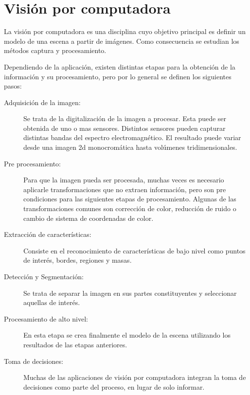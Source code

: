 
\section{Visión por computadora}

La visión por computadora es una disciplina cuyo objetivo principal es definir
un modelo de una escena a partir de imágenes\cite{cvLinda2001}. Como
consecuencia se estudian los métodos captura y procesamiento.

Dependiendo de la aplicación, existen distintas etapas para la obtención de la
información y su procesamiento, pero por lo general se definen los siguientes
pasos\cite{digitalImageProcessing2ed, wikiCV}:

\begin{description}

	\item[Adquisición de la imagen:] Se trata de la digitalización de la
		imagen a procesar. Esta puede ser obtenida de uno o mas
		sensores. Distintos sensores pueden capturar distintas bandas
		del espectro electromagnético. El resultado puede variar desde
		una imagen 2d monocromática hasta volúmenes tridimensionales.

	\item[Pre procesamiento:] Para que la imagen pueda ser procesada, muchas
		veces es necesario aplicarle transformaciones que no extraen
		información, pero son pre condiciones para las siguientes etapas
		de procesamiento. Algunas de las transformaciones comunes son
		corrección de color, reducción de ruido o cambio de sistema de
		coordenadas de color.

	\item[Extracción de características:] Consiste en el reconocimiento de
		características de bajo nivel como puntos de interés, bordes,
		regiones y masas.

	\item[Detección y Segmentación:] Se trata de separar la imagen en sus
		partes constituyentes y seleccionar aquellas de interés.

	\item[Procesamiento de alto nivel:] En esta etapa se crea finalmente el
		modelo de la escena utilizando los resultados de las etapas
		anteriores.

	\item[Toma de decisiones:] Muchas de las aplicaciones de visión por
		computadora integran la toma de decisiones como parte del
		proceso, en lugar de solo informar.

\end{description}

